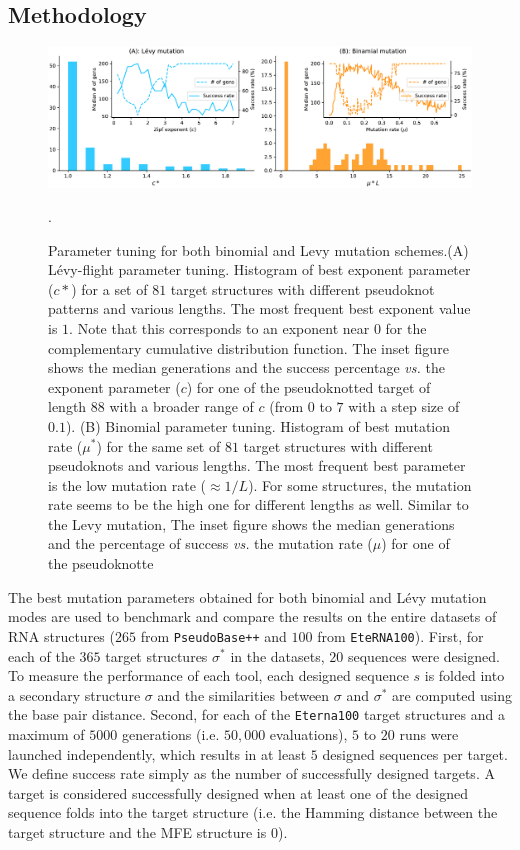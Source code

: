 \subsection*{Methodology}
\begin{figure}[t!]
	\centering
	\includegraphics[width=1.0\linewidth]{../res/images/arnaque/Tuning.pdf}
	\caption{Parameter tuning for both binomial and Levy mutation schemes.(A) Lévy-flight parameter tuning. Histogram of best exponent parameter ($c*$) for a set of $81$ target structures with different pseudoknot patterns and various lengths. The most frequent best exponent value is $1$. Note that this corresponds to an exponent near 0 for the complementary cumulative distribution function. The inset figure shows the median generations and the success percentage \emph{vs.} the exponent parameter ($c$) for one of the pseudoknotted target of length $88$ with a broader range of $c$ (from $0$ to $7$ with a step size of $0.1$). (B) Binomial parameter tuning. Histogram of best mutation rate ($\mu^*$) for the same set of $81$ target structures with different pseudoknots and various lengths. The most frequent best parameter is the low mutation rate ($\approx 1/L$). For some structures, the mutation rate seems to be the high one for different lengths as well. Similar to the Levy mutation, The inset figure shows the median generations and the percentage of success \emph{vs.} the mutation rate ($\mu$) for one of the pseudoknotte} \label{Fig:tunning}
	\medskip
	\small.
\end{figure}
The best mutation parameters obtained for both binomial and Lévy mutation modes are used to benchmark and compare the results on the entire datasets of RNA structures ($265$ from \texttt{PseudoBase++} and $100$ from \texttt{EteRNA100}). First, for each of the $365$ target structures $\sigma^*$ in the datasets, $20$ sequences were designed. To measure the performance of each tool, each designed sequence $s$ is folded into a secondary structure $\sigma$ and the similarities between $\sigma$ and $\sigma^*$ are computed using the base pair distance. Second, for each of the \texttt{Eterna100} target structures and a maximum of $5000$ generations (i.e. $50,000$ evaluations), $5$ to $20$ runs were launched independently, which results in at least $5$ designed sequences per target. We define success rate simply as the number of successfully designed targets. A target is considered successfully designed when at least one of the designed sequence folds into the target structure (i.e. the Hamming distance between the target structure and the MFE structure is $0$).

